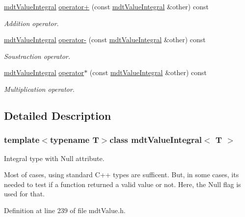 \begin{DoxyCompactItemize}
\hyperlink{classmdt_value_integral}{mdt\-Value\-Integral} \hyperlink{classmdt_value_integral_a63b608faed5f0d348bd67c731fa3a0b8}{operator+} (const \hyperlink{classmdt_value_integral}{mdt\-Value\-Integral} \&other) const 
\begin{DoxyCompactList}\small\item\em Addition operator. \end{DoxyCompactList}\item 
\hyperlink{classmdt_value_integral}{mdt\-Value\-Integral} \hyperlink{classmdt_value_integral_a3a13deb1355d6cf63c2f05f4e15b9743}{operator-\/} (const \hyperlink{classmdt_value_integral}{mdt\-Value\-Integral} \&other) const 
\begin{DoxyCompactList}\small\item\em Soustraction operator. \end{DoxyCompactList}\item 
\hyperlink{classmdt_value_integral}{mdt\-Value\-Integral} \hyperlink{classmdt_value_integral_a5f52adbe77b7b0314ddb3322d3b52d7f}{operator$\ast$} (const \hyperlink{classmdt_value_integral}{mdt\-Value\-Integral} \&other) const 
\begin{DoxyCompactList}\small\item\em Multiplication operator. \end{DoxyCompactList}\end{DoxyCompactItemize}


\subsection{Detailed Description}
\subsubsection*{template$<$typename T$>$class mdt\-Value\-Integral$<$ T $>$}

Integral type with Null attribute. 

Most of cases, using standard C++ types are sufficent. But, in some cases, its needed to test if a function returned a valid value or not. Here, the Null flag is used for that. 

Definition at line 239 of file mdt\-Value.\-h.



